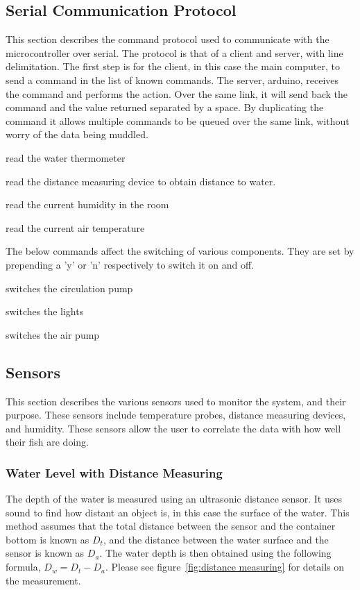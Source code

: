 \documentclass[american,12pt]{article}
\begin{document}
\subsection{Serial Communication Protocol}
This section describes the command protocol used to communicate with the
microcontroller over serial. The protocol is that of a client and server,
with line delimitation. The first step is for the client, in this case the
main computer, to send a command in the list of known commands. The server,
arduino, receives the command and performs the action. Over the same link, it
will send back the command and the value returned separated by a space. By
duplicating the command it allows multiple commands to be queued over the same
link, without worry of the data being muddled.

\begin{description}[style=nextline]
    \item[rWatThm] read the water thermometer
    \item[rdWaLvl] read the distance measuring device to obtain distance to water.
    \item[rdHumid] read the current humidity in the room
    \item[rdAirTm] read the current air temperature
\end{description}

The below commands affect the switching of various components. They are set by
prepending a 'y' or 'n' respectively to switch it on and off.

\begin{description}[style=nextline]
    \item[CiPump] switches the circulation pump
    \item[Lights] switches the lights
    \item[AirPmp] switches the air pump
\end{description}




\subsection{Sensors}
This section describes the various sensors used to monitor the system, and their
purpose. These sensors include temperature probes, distance measuring devices,
and humidity. These sensors allow the user to correlate the data with how well
their fish are doing.

\subsubsection{Water Level with Distance Measuring}
The depth of the water is measured using an ultrasonic distance sensor. It uses
sound to find how distant an object is, in this case the surface of the water.
This method assumes that the total distance between the sensor and the container
bottom is known as $D_t$, and the distance between the water surface and the sensor
is known as $D_a$. The water depth is then obtained using the following formula,
$D_w = D_t - D_a$. Please see figure~\ref{fig:distance measuring} for details on the
measurement.
\end{document}
